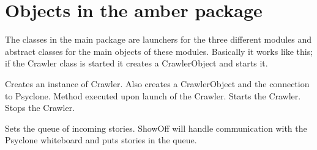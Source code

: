 \section{Objects in the amber package}

The classes in the main package are launchers for the three different modules
and abstract classes for the main objects of these modules. Basically it works
like this; if the Crawler class is started it creates a CrawlerObject and
starts it.



\begin{classmetadata}
\end{classmetadata}

\begin{interface}
    {Creates an instance of Crawler. Also creates a CrawlerObject and the
      connection to Psyclone.}
    {Method executed upon launch of the Crawler.}
    {Starts the Crawler.}
    {Stops the Crawler.}
\end{interface}




\begin{classmetadata}
\end{classmetadata}

\begin{interface}
\end{interface}




\begin{classmetadata}
\end{classmetadata}

\begin{interface}
\end{interface}




\begin{classmetadata}
\end{classmetadata}

\begin{interface}
    {Sets the queue of incoming stories. ShowOff will handle communication with
      the Psyclone whiteboard and puts stories in the queue.}
\end{interface}



